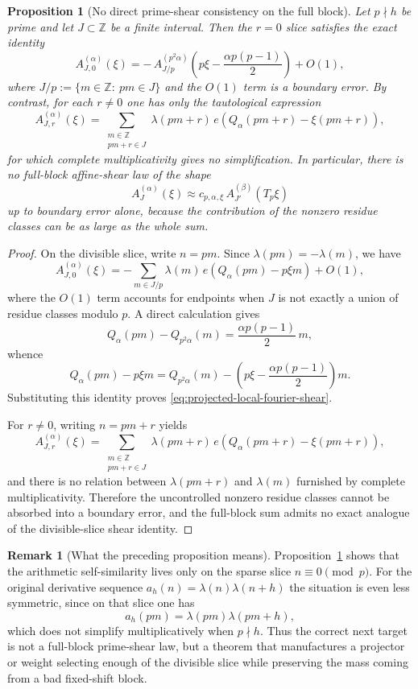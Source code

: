 \documentclass[11pt]{scrartcl}
\numberwithin{equation}{section}
\newtheorem{proposition}[theorem]{Proposition}
\theoremstyle{definition}
\newtheorem{remark}[theorem]{Remark}
\newcommand{\Z}{\mathbb Z}
\newcommand{\1}{\mathbf 1}
\newcommand{\ee}[1]{e\!\left(#1\right)}
\begin{document}
\begin{proposition}[No direct prime-shear consistency on the full block]
\label{prop:no-full-block-affine-shear}
Let $p\nmid h$ be prime and let $J\subset\Z$ be a finite interval. Then the $r=0$ slice satisfies the exact identity
\begin{equation}
\label{eq:projected-local-fourier-shear}
A_{J,0}^{(\alpha)}(\xi)
=
-\,A_{J/p}^{(p^2\alpha)}\!\left(p\xi-\frac{\alpha p(p-1)}{2}\right)
+O(1),
\end{equation}
where $J/p:=\{m\in\Z:\ pm\in J\}$ and the $O(1)$ term is a boundary error. By contrast, for each $r\neq 0$ one has only the tautological expression
\[
A_{J,r}^{(\alpha)}(\xi)
=
\sum_{\substack{m\in\Z\\ pm+r\in J}}
\lambda(pm+r)
\,\ee{Q_\alpha(pm+r)-\xi(pm+r)},
\]
for which complete multiplicativity gives no simplification. In particular, there is no full-block affine-shear law of the shape
\[
A_J^{(\alpha)}(\xi)
\approx
c_{p,\alpha,\xi}\,A_{J'}^{(\beta)}(T_p\xi)
\]
up to boundary error alone, because the contribution of the nonzero residue classes can be as large as the whole sum.
\end{proposition}

\begin{proof}
On the divisible slice, write $n=pm$. Since $\lambda(pm)=-\lambda(m)$, we have
\[
A_{J,0}^{(\alpha)}(\xi)
=
-\sum_{m\in J/p}\lambda(m)\,\ee{Q_\alpha(pm)-p\xi m} + O(1),
\]
where the $O(1)$ term accounts for endpoints when $J$ is not exactly a union of residue classes modulo $p$. A direct calculation gives
\[
Q_\alpha(pm)-Q_{p^2\alpha}(m)=\frac{\alpha p(p-1)}{2}\,m,
\]
whence
\[
Q_\alpha(pm)-p\xi m
=
Q_{p^2\alpha}(m)-\left(p\xi-\frac{\alpha p(p-1)}{2}\right)m.
\]
Substituting this identity proves \eqref{eq:projected-local-fourier-shear}.

For $r\neq 0$, writing $n=pm+r$ yields
\[
A_{J,r}^{(\alpha)}(\xi)
=
\sum_{\substack{m\in\Z\\ pm+r\in J}}
\lambda(pm+r)
\,\ee{Q_\alpha(pm+r)-\xi(pm+r)},
\]
and there is no relation between $\lambda(pm+r)$ and $\lambda(m)$ furnished by complete multiplicativity. Therefore the uncontrolled nonzero residue classes cannot be absorbed into a boundary error, and the full-block sum admits no exact analogue of the divisible-slice shear identity.
\end{proof}

\begin{remark}[What the preceding proposition means]
Proposition~\ref{prop:no-full-block-affine-shear} shows that the arithmetic self-similarity lives only on the sparse slice $n\equiv 0 \pmod p$. For the original derivative sequence $a_h(n)=\lambda(n)\lambda(n+h)$ the situation is even less symmetric, since on that slice one has
\[
a_h(pm)=\lambda(pm)\lambda(pm+h),
\]
which does not simplify multiplicatively when $p\nmid h$. Thus the correct next target is not a full-block prime-shear law, but a theorem that manufactures a projector or weight selecting enough of the divisible slice while preserving the mass coming from a bad fixed-shift block.
\end{remark}
\end{document}
